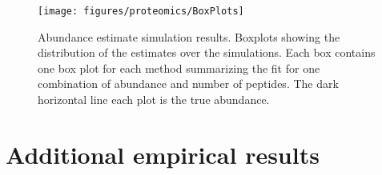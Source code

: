 \begin{figure}
\centering
\texttt{[image: figures/proteomics/BoxPlots]}
\caption{Abundance estimate simulation results.
Boxplots showing the distribution of the estimates over the simulations.
Each box contains one box plot for each method summarizing the fit for one combination of abundance and number of peptides.
The dark horizontal line each plot is the true abundance.}
\end{figure}




\clearpage

\section{Additional empirical results}

